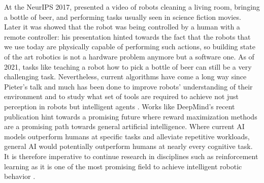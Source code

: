 At the NeurIPS 2017, \textcite{abbeel_youtube_2017} presented a video of robots cleaning a living room, bringing a bottle of beer, and performing tasks usually seen in science fiction movies.
Later it was showed that the robot was being controlled by a human with a remote controller: his presentation hinted towards the fact that the robots that we use today are physically capable of performing such actions, so building state of the art robotics is not a hardware problem anymore but a software one.
As of 2021, tasks like teaching a robot how to pick a bottle of beer can still be a very challenging task. Nevertheless, current algorithms have come a long way since Pieter's talk and much has been done to improve robots' understanding of their environment and to study what set of tools are required to achieve not just perception in robots but intelligent agents \cite{kok2020trust, trivedi2008soft}.
Works like DeepMind's recent publication \cite{silver2021reward} hint towards a promising future where reward maximization methods are a promising path towards general artificial intelligence. Where current AI models outperform humans at specific tasks and alleviate repetitive workloads, general AI would potentially outperform humans at nearly every cognitive task. 
It is therefore imperative to continue research in disciplines such as reinforcement learning as it is one of the most promising field to achieve intelligent robotic behavior \cite{song2021autonomous, abbeel_youtube_2017, kok2020trust, silver2021reward}.



